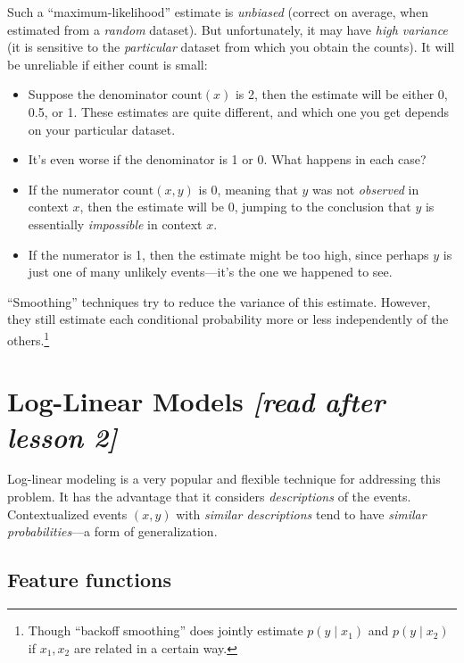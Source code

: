 \documentclass[11pt]{article}
\newcommand{\ph}{\hat{p}}
\begin{document}
Such a ``maximum-likelihood'' estimate is {\em unbiased} (correct on
average, when estimated from a {\em random} dataset).  But unfortunately, it
may have {\em high variance} (it is sensitive to the {\em particular}
dataset from which you obtain the counts).  It will be unreliable if
either count is small:
\begin{itemize}[noitemsep]
\item Suppose the denominator $\textrm{count}(x)$ is 2, then the estimate
  will be either 0, 0.5, or 1.  These estimates are quite different,
  and which one you get depends on your particular dataset.
\item It's even worse if the denominator is 1 or 0.  What happens in
  each case?
\item If the numerator $\textrm{count}(x,y)$ is 0, meaning that $y$
  was not {\em observed} in context $x$, then the estimate will
  be 0, jumping to the conclusion that $y$ is essentially {\em impossible} in context $x$.
\item If the numerator is 1, then the estimate might be too high,
  since perhaps $y$ is just one of many unlikely events---it's the one
  we happened to see.
\end{itemize}

\noindent
``Smoothing'' techniques try to reduce the variance of this estimate.
However, they still estimate each conditional probability more or less
independently of the others.\footnote{Though ``backoff smoothing'' does jointly
  estimate $p(y \mid x_1)$ and $p(y \mid x_2)$ if $x_1, x_2$ are
  related in a certain way.}

\section{Log-Linear Models {\em [read after lesson 2]}}\label{sec:loglin}

Log-linear modeling is a very popular and flexible technique for
addressing this problem.  It has the advantage that it considers {\em
  descriptions} of the events.  Contextualized events $(x,y)$ with
{\em similar descriptions} tend to have {\em similar probabilities}---a form
of generalization.

\subsection{Feature functions}\label{sec:featfuncs}
\end{document}
